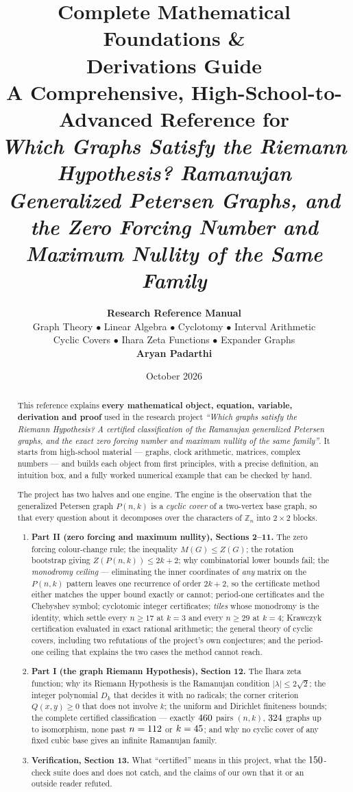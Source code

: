 \documentclass[11pt]{article}
\title{\vspace{-1.2cm}\textbf{\huge Complete Mathematical Foundations \&\\[4pt]
Derivations Guide}\\[10pt]
\Large A Comprehensive, High-School-to-Advanced Reference for\\[3pt]
\emph{Which Graphs Satisfy the Riemann Hypothesis? Ramanujan Generalized Petersen Graphs, and the Zero Forcing Number and Maximum Nullity of the Same Family}}
\author{\textbf{Research Reference Manual}\\[3pt]
Graph Theory $\bullet$ Linear Algebra $\bullet$ Cyclotomy $\bullet$ Interval Arithmetic\\
Cyclic Covers $\bullet$ Ihara Zeta Functions $\bullet$ Expander Graphs\\[6pt]
\textbf{Aryan Padarthi}}
\date{October 2026}
\begin{document}
\maketitle

\begin{abstract}
\noindent
This reference explains \textbf{every mathematical object, equation, variable, derivation and proof} used in the research project \emph{``Which graphs satisfy the Riemann Hypothesis? A certified classification of the Ramanujan generalized Petersen graphs, and the exact zero forcing number and maximum nullity of the same family''}. It starts from high-school material --- graphs, clock arithmetic, matrices, complex numbers --- and builds each object from first principles, with a precise definition, an intuition box, and a fully worked numerical example that can be checked by hand.

The project has two halves and one engine. The engine is the observation that the generalized Petersen graph $P(n,k)$ is a \emph{cyclic cover} of a two-vertex base graph, so that every question about it decomposes over the characters of $\mathbb Z_n$ into $2\times2$ blocks.

\begin{enumerate}[leftmargin=*,nosep]
  \item \textbf{Part II (zero forcing and maximum nullity), Sections 2--11.} The zero forcing colour-change rule; the inequality $M(G)\le Z(G)$; the rotation bootstrap giving $Z(P(n,k))\le2k+2$; why combinatorial lower bounds fail; the \emph{monodromy ceiling} --- eliminating the inner coordinates of \emph{any} matrix on the $P(n,k)$ pattern leaves one recurrence of order $2k+2$, so the certificate method either matches the upper bound exactly or cannot; period-one certificates and the Chebyshev symbol; cyclotomic integer certificates; \emph{tiles} whose monodromy is the identity, which settle every $n\ge17$ at $k=3$ and every $n\ge29$ at $k=4$; Krawczyk certification evaluated in exact rational arithmetic; the general theory of cyclic covers, including two refutations of the project's own conjectures; and the period-one ceiling that explains the two cases the method cannot reach.
  \item \textbf{Part I (the graph Riemann Hypothesis), Section 12.} The Ihara zeta function; why its Riemann Hypothesis is the Ramanujan condition $|\lambda|\le2\sqrt2$; the integer polynomial $D_k$ that decides it with no radicals; the corner criterion $Q(x,y)\ge0$ that does not involve $k$; the uniform and Dirichlet finiteness bounds; the complete certified classification --- exactly $460$ pairs $(n,k)$, $324$ graphs up to isomorphism, none past $n=112$ or $k=45$; and why no cyclic cover of any fixed cubic base gives an infinite Ramanujan family.
  \item \textbf{Verification, Section 13.} What ``certified'' means in this project, what the $150$-check suite does and does not catch, and the claims of our own that it or an outside reader refuted.
\end{enumerate}


\end{abstract}
\end{document}
